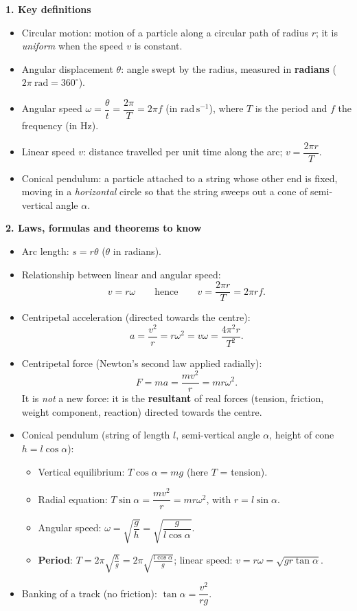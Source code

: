 \documentclass[11pt]{article}
\newcommand{\cle}[1]{{\popxbold\color{popdark}#1}}
\begin{document}
\begin{bilan}
\textbf{1. Key definitions}
\begin{itemize}
\item \cle{Circular motion}: motion of a particle along a circular path of radius $r$; it is \emph{uniform} when the speed $v$ is constant.
\item \cle{Angular displacement} $\theta$: angle swept by the radius, measured in \textbf{radians} ($2\pi\ \mathrm{rad}=360^{\circ}$).
\item \cle{Angular speed} $\omega=\dfrac{\theta}{t}=\dfrac{2\pi}{T}=2\pi f$ (in $\mathrm{rad\,s^{-1}}$), where $T$ is the \cle{period} and $f$ the \cle{frequency} (in Hz).
\item \cle{Linear speed} $v$: distance travelled per unit time along the arc; $v=\dfrac{2\pi r}{T}$.
\item \cle{Conical pendulum}: a particle attached to a string whose other end is fixed, moving in a \emph{horizontal} circle so that the string sweeps out a cone of semi-vertical angle $\alpha$.
\end{itemize}

\textbf{2. Laws, formulas and theorems to know}
\begin{itemize}
\item Arc length: $s=r\theta$ ($\theta$ in radians).
\item Relationship between linear and angular speed:
\[ v=r\omega \qquad\text{hence}\qquad v=\frac{2\pi r}{T}=2\pi r f. \]
\item \cle{Centripetal acceleration} (directed towards the centre):
\[ a=\frac{v^{2}}{r}=r\omega^{2}=v\omega=\frac{4\pi^{2}r}{T^{2}}. \]
\item \cle{Centripetal force} (Newton's second law applied radially):
\[ F=ma=\frac{mv^{2}}{r}=mr\omega^{2}. \]
It is \emph{not} a new force: it is the \textbf{resultant} of real forces (tension, friction, weight component, reaction) directed towards the centre.
\item Conical pendulum (string of length $l$, semi-vertical angle $\alpha$, height of cone $h=l\cos\alpha$):
\begin{itemize}
\item Vertical equilibrium: $T\cos\alpha=mg$ (here $T$ = tension).
\item Radial equation: $T\sin\alpha=\dfrac{mv^{2}}{r}=mr\omega^{2}$, with $r=l\sin\alpha$.
\item Angular speed: $\omega=\sqrt{\dfrac{g}{h}}=\sqrt{\dfrac{g}{l\cos\alpha}}$.
\item \textbf{Period}: $\displaystyle T=2\pi\sqrt{\frac{h}{g}}=2\pi\sqrt{\frac{l\cos\alpha}{g}}$; linear speed: $v=r\omega=\sqrt{gr\tan\alpha}$.
\end{itemize}
\item Banking of a track (no friction): $\tan\alpha=\dfrac{v^{2}}{rg}$.
\end{itemize}


\end{bilan}
\end{document}
